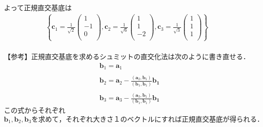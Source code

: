 \documentclass[dvipdfmx,uplatex,11pt]{jsarticle}
\begin{document}
よって正規直交基底は
\begin{eqnarray*}
\left\{
\bm{c}_1=\frac{1}{\sqrt{2}}
\begin{pmatrix}
1 \\
-1 \\
0 \\
\end{pmatrix}
,
\bm{c}_2 =\frac{1}{\sqrt{6}}
\begin{pmatrix}
1 \\
1 \\
-2 \\
\end{pmatrix}
,
\bm{c}_3 =\frac{1}{\sqrt{3}}
\begin{pmatrix}
1 \\
1 \\
1 \\
\end{pmatrix}
\right\}
\end{eqnarray*}
\dotfill \\
【参考】正規直交基底を求めるシュミットの直交化法は次のように書き直せる．
\begin{eqnarray*}
& \bm{b}_1 =\bm{a}_1 \\ \\
& \bm{b}_2 =\bm{a}_2-\frac{(\bm{a}_2 ,\bm{b}_1)}{(\bm{b}_1 ,\bm{b}_1 )}\bm{b_1} \\ \\
& \bm{b}_3 =\bm{a}_3-\frac{(\bm{a}_3 ,\bm{b}_1)}{(\bm{b}_1 ,\bm{b}_1 )}\bm{b_1} 
\end{eqnarray*}
この式からそれぞれ$\bm{b}_1, \bm{b}_2, \bm{b}_3 を求めて，それぞれ大きさ１のベクトルにすれば正規直交基底が得られる．$
%
%
%
\newpage
%
%
%
\end{document}
